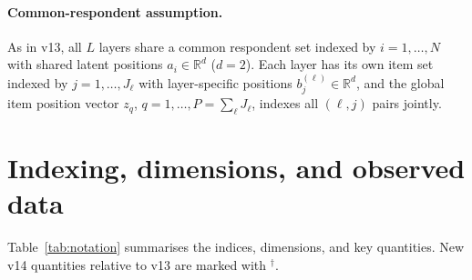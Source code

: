\documentclass[11pt]{article}
\newcommand{\R}{\mathbb{R}}
\begin{document}
\paragraph{Common-respondent assumption.}
As in v13, all $L$ layers share a common respondent set indexed by
$i=1,\ldots,N$ with shared latent positions $a_i\in\R^d$ ($d=2$).
Each layer has its own item set indexed by $j=1,\ldots,J_\ell$ with
layer-specific positions $b_j^{(\ell)}\in\R^d$, and the global item
position vector $z_q$, $q=1,\ldots,P=\sum_\ell J_\ell$, indexes all
$(\ell,j)$ pairs jointly.

\section{Indexing, dimensions, and observed data}
\label{sec:indexing}

Table~\ref{tab:notation} summarises the indices, dimensions, and key
quantities. New v14 quantities relative to v13 are marked with
$^{\dagger}$.
\end{document}

